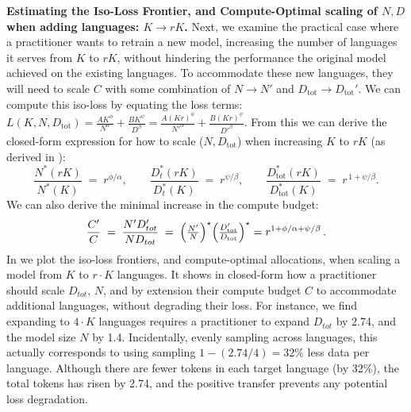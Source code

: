 \noindent\textbf{Estimating the Iso-Loss Frontier, and Compute-Optimal scaling of $N,D$ when adding languages: $K\rightarrow rK$.} 
Next, we examine the practical case where a practitioner wants to retrain a new model, increasing the number of languages it serves from $K$ to $rK$, without hindering the performance the original model achieved on the existing languages.
To accommodate these new languages, they will need to scale $C$ with some combination of $N\rightarrow N'$ and $D_{\mathrm{tot}}\rightarrow D_{\mathrm{tot}}'$.
We can compute this iso-loss by equating the loss terms: $L(K,N,D_{\mathrm{tot}}) = \frac{A K^{\phi}}{N^{\alpha}} + \frac{B K^{\psi}}{D^{\beta}} = \frac{A (K r)^{\phi}}{N'^{\alpha}} + \frac{B (K r)^{\psi}}{D'^{\beta}}$. 
From this we can derive the closed-form expression for how to scale ($N,D_{\mathrm{tot}}$) when increasing $K$ to $rK$ (as derived in ):
\[
\frac{N^{*}(rK)}{N^{*}(K)} \;=\; r^{\phi/\alpha},
\qquad
\frac{D_t^{*}(rK)}{D_t^{*}(K)} \;=\; r^{\psi/\beta},
\qquad
\frac{D_{\mathrm{tot}}^{*}(rK)}{D_{\mathrm{tot}}^{*}(K)} \;=\; r^{\,1+\psi/\beta}.
\]
We can also derive the minimal increase in the compute budget:
\[
\frac{C'}{C}
\;=\;
\frac{N' D_{tot}'}{N D_{tot}}
\;=\;
\Bigl(\tfrac{N'}{N}\Bigr)^\star
\Bigl(\tfrac{D'_{\mathrm{tot}}}{D_{\mathrm{tot}}}\Bigr)^\star = r^{1+\phi/\alpha+\psi/\beta}\,.
\]
In  we plot the iso-loss frontiers, and compute-optimal allocations, when scaling a model from $K$ to $r \cdot K$ languages.
It shows in closed-form how a practitioner should scale $D_{tot}$, $N$, and by extension their compute budget $C$ to accommodate additional languages, without degrading their loss.
For instance, we find expanding to $4 \cdot K$ languages requires a practitioner to expand $D_{tot}$ by 2.74, and the model size $N$ by 1.4.
Incidentally, evenly sampling across languages, this actually corresponds to using sampling $1-(2.74/4)=32\%$ less data per language.
Although there are fewer tokens in each target language (by 32\%), the total tokens has risen by 2.74, and the positive transfer prevents any potential loss degradation.

